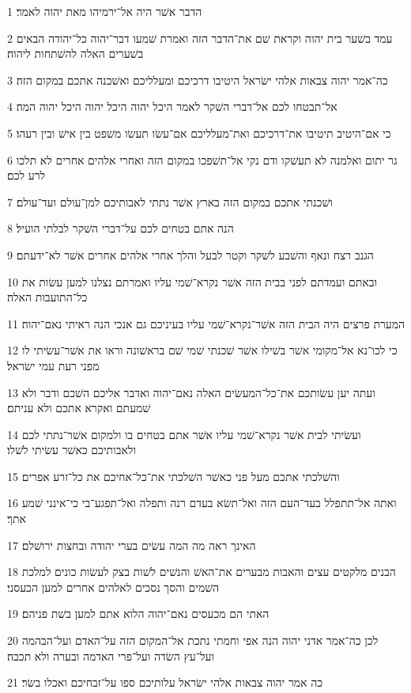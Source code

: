 \par 1 הדבר אשׁר היה אל־ירמיהו מאת יהוה לאמר׃
\par 2 עמד בשׁער בית יהוה וקראת שׁם את־הדבר הזה ואמרת שׁמעו דבר־יהוה כל־יהודה הבאים בשׁערים האלה להשׁתחות ליהוה׃
\par 3 כה־אמר יהוה צבאות אלהי ישׂראל היטיבו דרכיכם ומעלליכם ואשׁכנה אתכם במקום הזה׃
\par 4 אל־תבטחו לכם אל־דברי השׁקר לאמר היכל יהוה היכל יהוה היכל יהוה המה׃
\par 5 כי אם־היטיב תיטיבו את־דרכיכם ואת־מעלליכם אם־עשׂו תעשׂו משׁפט בין אישׁ ובין רעהו׃
\par 6 גר יתום ואלמנה לא תעשׁקו ודם נקי אל־תשׁפכו במקום הזה ואחרי אלהים אחרים לא תלכו לרע לכם׃
\par 7 ושׁכנתי אתכם במקום הזה בארץ אשׁר נתתי לאבותיכם למן־עולם ועד־עולם׃
\par 8 הנה אתם בטחים לכם על־דברי השׁקר לבלתי הועיל׃
\par 9 הגנב רצח ונאף והשׁבע לשׁקר וקטר לבעל והלך אחרי אלהים אחרים אשׁר לא־ידעתם׃
\par 10 ובאתם ועמדתם לפני בבית הזה אשׁר נקרא־שׁמי עליו ואמרתם נצלנו למען עשׂות את כל־התועבות האלה׃
\par 11 המערת פרצים היה הבית הזה אשׁר־נקרא־שׁמי עליו בעיניכם גם אנכי הנה ראיתי נאם־יהוה׃
\par 12 כי לכו־נא אל־מקומי אשׁר בשׁילו אשׁר שׁכנתי שׁמי שׁם בראשׁונה וראו את אשׁר־עשׂיתי לו מפני רעת עמי ישׂראל׃
\par 13 ועתה יען עשׂותכם את־כל־המעשׂים האלה נאם־יהוה ואדבר אליכם השׁכם ודבר ולא שׁמעתם ואקרא אתכם ולא עניתם׃
\par 14 ועשׂיתי לבית אשׁר נקרא־שׁמי עליו אשׁר אתם בטחים בו ולמקום אשׁר־נתתי לכם ולאבותיכם כאשׁר עשׂיתי לשׁלו׃
\par 15 והשׁלכתי אתכם מעל פני כאשׁר השׁלכתי את־כל־אחיכם את כל־זרע אפרים׃
\par 16 ואתה אל־תתפלל בעד־העם הזה ואל־תשׂא בעדם רנה ותפלה ואל־תפגע־בי כי־אינני שׁמע אתך׃
\par 17 האינך ראה מה המה עשׂים בערי יהודה ובחצות ירושׁלם׃
\par 18 הבנים מלקטים עצים והאבות מבערים את־האשׁ והנשׁים לשׁות בצק לעשׂות כונים למלכת השׁמים והסך נסכים לאלהים אחרים למען הכעסני׃
\par 19 האתי הם מכעסים נאם־יהוה הלוא אתם למען בשׁת פניהם׃
\par 20 לכן כה־אמר אדני יהוה הנה אפי וחמתי נתכת אל־המקום הזה על־האדם ועל־הבהמה ועל־עץ השׂדה ועל־פרי האדמה ובערה ולא תכבה׃
\par 21 כה אמר יהוה צבאות אלהי ישׂראל עלותיכם ספו על־זבחיכם ואכלו בשׂר׃
